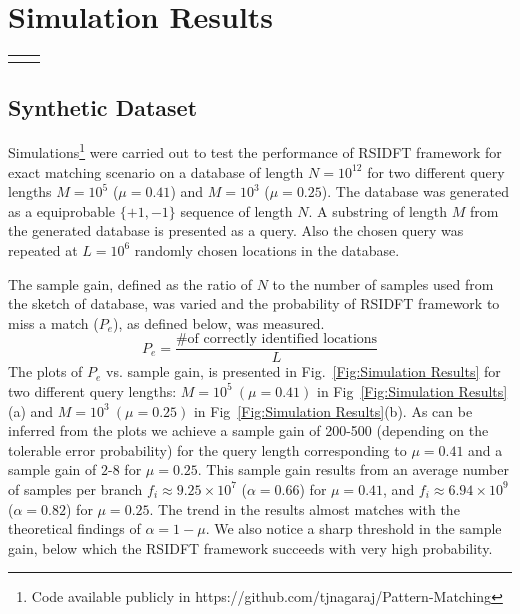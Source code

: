 \section{Simulation Results} \label{sec:Simulation_Results}


\begin{figure*}[ht]
		\begin{tabular}{cc}
			\subfloat[$M=10^5(\mu=0.41), \tilde{N}=10^7, ~G=10^{5}$]{\resizebox{0.40\textwidth}{!}{}}&
			\subfloat[$M=10^3(\mu=0.25),~ \tilde{N}=10^6, ~G=10^{6}$]{\resizebox{0.40\textwidth}{!}{}}
		\end{tabular}
		
		\caption{Plots of probability of missing a match vs. sample gain for exact matching of a query of length $M$ from a equiprobable  binary \{+1,-1\} sequence of length $N= 10^{12}$, divided into $G$ blocks each of length $\tilde{N}$. The substring was simulated to repeat in $L=10^6$($\lambda=0.5$) locations uniformly at random.} \label{Fig:Simulation Results}
\end{figure*}

\subsection{Synthetic Dataset}
Simulations\footnote{Code available publicly in https://github.com/tjnagaraj/Pattern-Matching } were carried out to test the performance of RSIDFT framework for exact matching scenario on a database of length $N=10^{12}$ for two different query lengths $M=10^5$ ($\mu = 0.41$) and $M=10^3$ ($\mu = 0.25$). The database was generated as a equiprobable $\{+1,-1\}$ sequence of length $N$. A substring of length $M$ from the generated database is presented as a query. Also the chosen query was repeated at $L=10^6$ randomly chosen locations in the database.

The sample gain, defined as the ratio of $N$ to the number of samples used from the sketch of database, was varied and the probability of RSIDFT framework to miss a match ($P_e$), as defined below, was measured.
\[P_e = \frac{\text{\# of correctly identified locations}}{L} \]   
The plots of $P_e$ vs. sample gain, is presented in Fig.~\ref{Fig:Simulation Results} for two different query lengths: $M=10^5~(\mu=0.41)$ in Fig~\ref{Fig:Simulation Results}(a) and $M=10^3~(\mu=0.25)$ in Fig~\ref{Fig:Simulation Results}(b). As can be inferred from the plots we achieve a sample gain of 200-500 (depending on the tolerable error probability) for the query length corresponding to  $\mu=0.41$ and a sample gain of $2$-$8$ for $\mu=0.25$. This sample gain results from an average number of samples per branch $f_i \approx 9.25 \times10^7 $ ($\alpha=0.66$) for $\mu=0.41$, and  $f_i \approx 6.94\times10^9 $ ($\alpha=0.82$) for $\mu=0.25$. The trend in the results almost matches with the theoretical findings of $\alpha = 1-\mu$. We also notice a sharp threshold in the sample gain, below which the RSIDFT framework succeeds with very high probability. 


